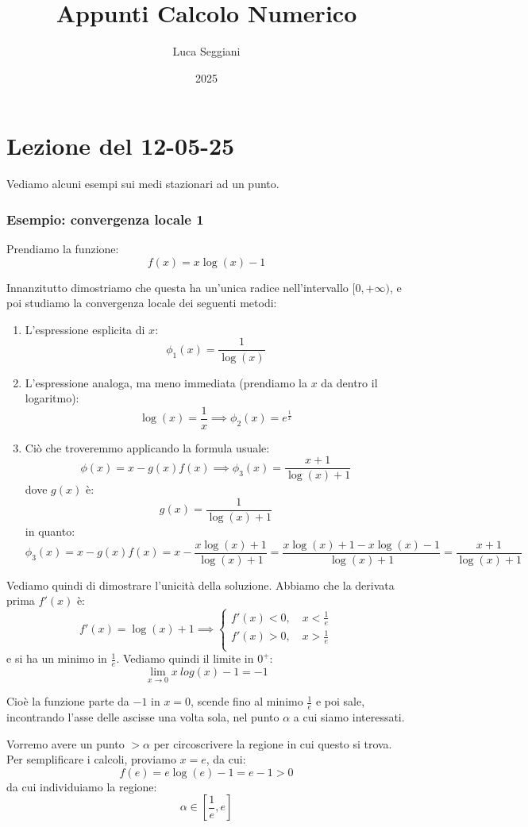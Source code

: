 \documentclass[a4paper,11pt]{article}
\title{Appunti Calcolo Numerico}
\author{Luca Seggiani}
\date{2025}
\begin{document}
\section{Lezione del 12-05-25}

\thispagestyle{empty}
\pagestyle{fancy}

Vediamo alcuni esempi sui medi stazionari ad un punto.

\subsubsection{Esempio: convergenza locale 1}
Prendiamo la funzione:
$$
f(x) = x \log(x) - 1
$$

Innanzitutto dimostriamo che questa ha un'unica radice nell'intervallo $[0, +\infty)$, e poi studiamo la convergenza locale dei seguenti metodi:
\begin{enumerate}
	\item L'espressione esplicita di $x$:
		$$
		\phi_1(x) = \frac{1}{\log(x)}
		$$
	\item L'espressione analoga, ma meno immediata (prendiamo la $x$ da dentro il logaritmo):
		$$
		\log(x) = \frac{1}{x} \implies \phi_2(x) = e^{\frac{1}{x}}
		$$
	\item Ciò che troveremmo applicando la formula usuale:
		$$
		\phi(x) = x - g(x) f(x) \implies \phi_3(x) = \frac{x + 1}{\log(x) + 1}
		$$
		dove $g(x)$ è:
		$$
		g(x) = \frac{1}{\log(x) + 1} 
		$$
		in quanto:
		$$
		\phi_3(x) = x - g(x) f(x) = x - \frac{x \log(x) + 1}{\log(x) + 1} = \frac{x \log(x) + 1 - x \log(x) - 1}{\log(x) + 1} = \frac{x + 1}{\log(x) + 1}
		$$
\end{enumerate}

Vediamo quindi di dimostrare l'unicità della soluzione.
Abbiamo che la derivata prima $f'(x)$ è:
$$
f'(x) = \log(x) + 1 \implies 
\begin{cases}
	f'(x) < 0, \quad x < \frac{1}{e} \\			
	f'(x) > 0, \quad x > \frac{1}{e} \\			
\end{cases}
$$
e si ha un minimo in $\frac{1}{e}$.
Vediamo quindi il limite in $0^+$:
$$
\lim_{x\rightarrow 0} x\ log(x) - 1 = -1
$$

Cioè la funzione parte da $-1$ in $x = 0$, scende fino al minimo $\frac{1}{e}$ e poi sale, incontrando l'asse delle ascisse una volta sola, nel punto $\alpha$ a cui siamo interessati.

Vorremo avere un punto $> \alpha$ per circoscrivere la regione in cui questo si trova.
Per semplificare i calcoli, proviamo $x = e$, da cui:
$$
f(e) = e \log(e) - 1 = e - 1 > 0
$$
da cui individuiamo la regione:
$$
\alpha \in \left[\frac{1}{e}, e\right]
$$
\end{document}
